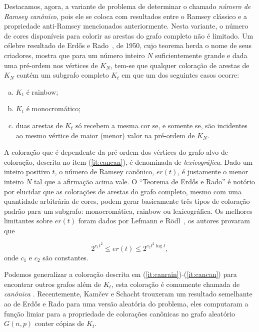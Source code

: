 \documentclass[12pt,a4paper]{book}
\begin{document}
Destacamos, agora, a variante de problema de determinar o chamado \emph{número de Ramsey canônico},
 pois ele se coloca com resultados entre o Ramsey clássico e a propriedade anti-Ramsey mencionados anteriormente.
 Nesta variante, o número de cores disponíveis para colorir as arestas do grafo completo não é limitado.
 Um célebre resultado de Erd\H{o}s e Rado~\cite{erdoes_rado50}, de 1950, cujo teorema herda o nome de seus criadores, mostra que para um número inteiro $N$ suficientemente grande
e dada uma pré-ordem nos vértices de $K_N$, tem-se que qualquer coloração de arestas de $K_N$ contém um subgrafo completo $K_t$
em que um dos seguintes casos ocorre:
\begin{enumerate}[(a)]
    \item \label{it:canrain} $K_t$ é rainbow;
    \item \label{it:canmono} $K_t$ é monocromático;
    \item \label{it:cancan} duas arestas de $K_t$ só recebem a mesma cor se, e somente se, são incidentes ao mesmo vértice de maior (menor) valor na pré-ordem de $K_N$.
\end{enumerate}

A coloração que é dependente da pré-ordem dos vértices do grafo alvo de coloração, descrita no item (\ref{it:cancan}), é denominada de \emph{lexicográfica}. 
Dado um inteiro positivo $t$, o número de Ramsey canônico, $er(t)$, é justamente o menor inteiro $N$ tal que a afirmação acima vale.  
O ``Teorema de Erd\H{o}s e Rado'' é notório por elucidar que as colorações de arestas do grafo completo, mesmo com uma quantidade arbitrária de cores, podem gerar basicamente três tipos de coloração padrão para um subgrafo: monocromática, rainbow ou lexicográfica. 
Os melhores limitantes sobre $er(t)$ foram dados por Lefmann e R{\"o}dl~\cite{lefmann1995erdHos}, os autores provaram que

$$2^{c_1t^2}\leq er(t) \leq 2^{c_2t^2\log t},$$ 
onde $c_1$ e $c_2$ são constantes.

Podemos generalizar a coloração descrita em (\ref{it:canrain})-(\ref{it:cancan}) para encontrar outros grafos além de $K_t$, esta coloração é comumente chamada de \emph{canônica} \cite{lefmann1993canonical, axenovich2005canonical}.
Recentemente, Kam{\v{c}}ev e Schacht  \cite{kamvcev2023canonical} trouxeram um resultado semelhante ao de Erd\H{o}s e Rado para uma versão aleatória do problema, eles computaram a função limiar para a propriedade de colorações canônicas no grafo aleatório $G(n,p)$ conter cópias de $K_t$.
\end{document}
